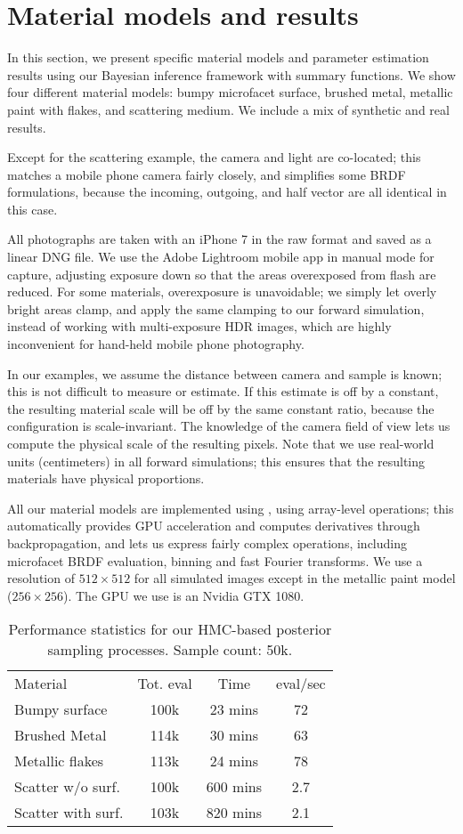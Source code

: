 \section{Material models and results}
\label{sec:results}

In this section, we present specific material models and parameter estimation results using our Bayesian inference framework with summary functions. We show four different material models: bumpy microfacet surface, brushed metal, metallic paint with flakes, and scattering medium. We include a mix of synthetic and real results.

Except for the scattering example, the camera and light are co-located; this matches a mobile phone camera fairly closely, and simplifies some BRDF formulations, because the incoming, outgoing, and half vector are all identical in this case.

All photographs are taken with an iPhone 7 in the raw format and saved as a linear DNG file. We use the Adobe Lightroom mobile app in manual mode for capture, adjusting exposure down so that the areas overexposed from flash are reduced. For some materials, overexposure is unavoidable; we simply let overly bright areas clamp, and apply the same clamping to our forward simulation, instead of working with multi-exposure HDR images, which are highly inconvenient for hand-held mobile phone photography.

In our examples, we assume the distance between camera and sample is known; this is not difficult to measure or estimate. If this estimate is off by a constant, the resulting material scale will be off by the same constant ratio, because the configuration is scale-invariant. The knowledge of the camera field of view lets us compute the physical scale of the resulting pixels. Note that we use real-world units (centimeters) in all forward simulations; this ensures that the resulting materials have physical proportions.

All our material models are implemented using \torch, using array-level operations; this automatically provides GPU acceleration and computes derivatives through backpropagation, and lets us express fairly complex operations, including microfacet BRDF evaluation, binning and fast Fourier transforms. We use a resolution of $512 \times 512$ for all simulated images except in the metallic paint model ($256 \times 256$). The GPU we use is an Nvidia GTX 1080.

\begin{table}[t]
\caption{Performance statistics for our HMC-based posterior sampling processes. Sample count: 50k.\label{fig:performance}}
\begin{tabular}{l|c|c|c}
	Material &Tot. eval & Time & eval/sec \\
	Bumpy surface    &100k & 23 mins & 72 \\
	Brushed Metal    &114k & 30 mins & 63 \\
	Metallic flakes  &113k & 24 mins & 78 \\
	Scatter w/o surf.&100k & 600 mins & 2.7 \\
	Scatter with surf.& 103k & 820 mins & 2.1
\end{tabular}
\end{table}

